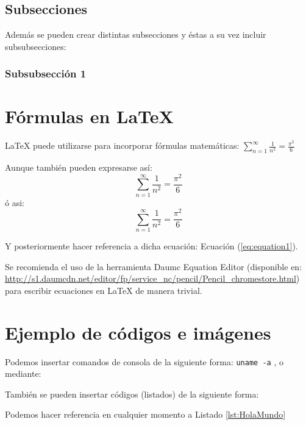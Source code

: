 \documentclass[11pt]{article}
\begin{document}
\subsection{Subsecciones}
Además se pueden crear distintas subsecciones y éstas a su vez incluir subsubsecciones:
\subsubsection{Subsubsección 1}


\section{Fórmulas en \LaTeX{}}
\LaTeX{} puede utilizarse para incorporar fórmulas matemáticas:
$\sum_{n=1}^\infty\frac{1}{n^2}=\frac{\pi^2}{6}$

Aunque también pueden expresarse así:
\begin{equation} \label{eq:equation1}
\sum_{n=1}^\infty\frac{1}{n^2}=\frac{\pi^2}{6}
\end{equation}
ó asi:
\begin{equation*}
\sum_{n=1}^\infty\frac{1}{n^2}=\frac{\pi^2}{6}
\end{equation*}

Y posteriormente hacer referencia a dicha ecuación: Ecuación (\ref{eq:equation1}).

Se recomienda el uso de la herramienta Daumc Equation Editor (disponible en: \url{http://s1.daumcdn.net/editor/fp/service_nc/pencil/Pencil_chromestore.html}) para escribir ecuaciones en \LaTeX{} de manera trivial.


\section{Ejemplo de códigos e imágenes}
Podemos insertar comandos de consola de la siguiente forma:  \texttt{uname -a} , o mediante:

También se pueden insertar códigos (listados) de la siguiente forma:


Podemos hacer referencia en cualquier momento a Listado \ref{lst:HolaMundo}
\end{document}
